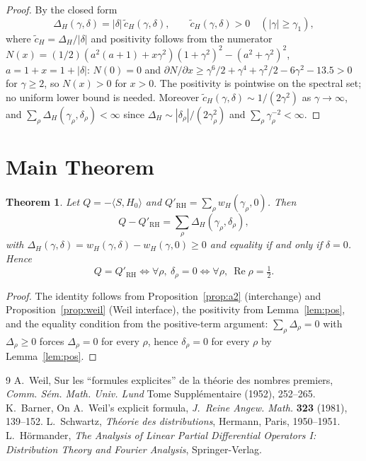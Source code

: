 \documentclass[11pt]{article}
\newtheorem{theorem}{Theorem}[section]
\begin{document}
\begin{proof}
By the closed form
\begin{equation}
\Delta_H(\gamma,\delta)=|\delta|\,\widetilde c_H(\gamma,\delta),
\qquad
\widetilde c_H(\gamma,\delta)>0 \quad (|\gamma|\ge\gamma_1),
\label{eq:ctilde}
\end{equation}
where $\widetilde c_H=\Delta_H/|\delta|$ and positivity follows from the
numerator $N(x)=(1/2)(a^2(a+1)+x\gamma^2)(1+\gamma^2)^2-(a^2+\gamma^2)^2$,
$a=1+x=1+|\delta|$: $N(0)=0$ and $\partial N/\partial x\ge
\gamma^6/2+\gamma^4+\gamma^2/2-6\gamma^2-13.5>0$ for $\gamma\ge2$, so
$N(x)>0$ for $x>0$.  The positivity is pointwise on the spectral set; no
uniform lower bound is needed.  Moreover
$\widetilde c_H(\gamma,\delta)\sim 1/(2\gamma^2)$ as $\gamma\to\infty$,
and $\sum_\rho\Delta_H(\gamma_\rho,\delta_\rho)<\infty$ since
$\Delta_H\sim|\delta_\rho|/(2\gamma_\rho^2)$ and
$\sum_\rho\gamma_\rho^{-2}<\infty$.
\end{proof}

\section{Main Theorem}

\begin{theorem}\label{thm:main}
Let $Q=-\langle S,H_0\rangle$ and
$Q'_{\mathrm{RH}}=\sum_\rho w_H(\gamma_\rho,0)$.  Then
\begin{equation}
Q-Q'_{\mathrm{RH}}=\sum_\rho \Delta_H(\gamma_\rho,\delta_\rho),
\end{equation}
with $\Delta_H(\gamma,\delta)=w_H(\gamma,\delta)-w_H(\gamma,0)\ge0$ and
equality if and only if $\delta=0$.  Hence
\begin{equation}
Q=Q'_{\mathrm{RH}} \iff \forall\rho,\ \delta_\rho=0
\iff \forall\rho,\ \operatorname{Re}\rho=\tfrac12.
\end{equation}
\end{theorem}

\begin{proof}
The identity follows from Proposition~\ref{prop:a2} (interchange) and
Proposition~\ref{prop:weil} (Weil interface), the positivity from
Lemma~\ref{lem:pos}, and the equality condition from the positive-term
argument: $\sum_\rho\Delta_\rho=0$ with $\Delta_\rho\ge0$ forces
$\Delta_\rho=0$ for every $\rho$, hence $\delta_\rho=0$ for every $\rho$
by Lemma~\ref{lem:pos}.
\end{proof}

\begin{thebibliography}{9}
A.~Weil, Sur les ``formules explicites'' de la th\'eorie des nombres
premiers, \emph{Comm. S\'em. Math. Univ. Lund} Tome Suppl\'ementaire
(1952), 252--265.
K.~Barner, On A.~Weil's explicit formula,
\emph{J.~Reine Angew. Math.} \textbf{323} (1981), 139--152.
L.~Schwartz, \emph{Th\'eorie des distributions}, Hermann, Paris,
1950--1951.
L.~H\"ormander, \emph{The Analysis of Linear Partial Differential
Operators I: Distribution Theory and Fourier Analysis}, Springer-Verlag.
\end{thebibliography}
\end{document}
